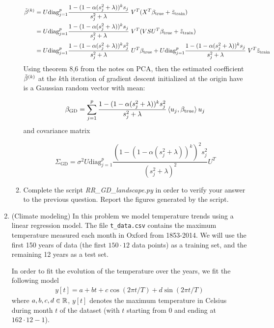 \documentclass[12pt,twoside]{article}
\begin{document}
\begin{enumerate}
\begin{enumerate}
\begin{align*}
	\tilde{ \beta }^{\left( k \right)} &=  U  \text{diag}_{j=1}^p \frac{ 1 - ( 1 - \alpha (s_j^2 + \lambda))^{k} s_j}{s_j^2 + \lambda}  \;  V^T (X^T \beta_{\operatorname{true}} + \tilde{ z }_{\operatorname{train}} )\\
					&=  U  \text{diag}_{j=1}^p \frac{ 1 - ( 1 - \alpha (s_j^2 + \lambda))^{k} s_j}{s_j^2 + \lambda}  \;  V^T (V S U^T \beta_{\operatorname{true}} + \tilde{ z }_{\operatorname{train}} )\\
					&=  U  \text{diag}_{j=1}^p \frac{ 1 - ( 1 - \alpha (s_j^2 + \lambda))^{k} s_j^2}{s_j^2 + \lambda}  \; U^T \beta_{\operatorname{true}} 
					+      U  \text{diag}_{j=1}^p \frac{ 1 - ( 1 - \alpha (s_j^2 + \lambda))^{k} s_j}{s_j^2 + \lambda}  \;  V^T  \tilde{ z }_{\operatorname{train}} \\
\end{align*}
Using theorem 8,6 from the notes on PCA, then  the estimated coefficient $\tilde{ \beta }^{\left( k \right)}$ at the $k$th iteration of gradient descent initialized at the origin have is a Gaussian random vector  with mean:

$$ \beta_{\text{GD}}  = \sum_{j=1}^p  \frac{ 1 - ( 1 - \alpha (s_j^2 + \lambda))^{k} s_j^2}{s_j^2 + \lambda}  \left \langle u_j, \beta_{\operatorname{true}}\right \rangle u_j $$
and covariance matrix

$$ \Sigma_{\text{GD}} = \sigma^2 U  \text{diag}_{j=1}^p \frac{ (1 - ( 1 - \alpha (s_j^2 + \lambda))^{k})^2 s_j^2}{(s_j^2 + \lambda)^2}  U^T $$

\item Complete the script \emph{RR\_GD\_landscape.py} in order to verify your answer to the previous question. Report the figures generated by the script.
\end{enumerate}
 
\newpage

\item  (Climate modeling) In this problem we model temperature trends using a linear regression model. The file 
\texttt{t\_data.csv} contains the maximum temperature measured
  each month in Oxford from 1853-2014.  We will use the first
  150 years of data (the first $150\cdot 12$ data points) as a training set, and
  the remaining 12 years as a test set.

 In order to fit the evolution of the temperature over the years, we fit the following model
  \begin{align}
  y[t] = a + bt + c \cos(2\pi t/T) + d\sin(2\pi  t/T)
  \end{align}
  where $a,b,c,d\in\mathbb{R}$, $y[t]$ denotes the maximum temperature in Celsius during month $t$ of the dataset (with $t$ starting from $0$ and ending at $162\cdot 12-1$).
   

\end{enumerate}
\end{document}
